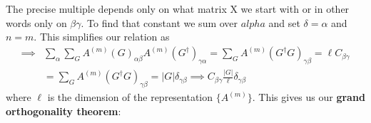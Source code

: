 \documentclass{article}
\begin{document}
	The precise multiple depends only on what matrix X we start with or in other words only on $\beta \gamma$. To find that constant we sum over $alpha$ and set $\delta = \alpha$ and $n = m$. This simplifies our relation as
	\begin{equation}
		\begin{split}
			\implies &\sum_\alpha \sum_{G}A^{(m)}(G)_{\alpha \beta}  A^{(m)}(G^\dagger)_{\gamma \alpha} = \sum_G A^{(m)}(G^\dagger G)_{\gamma \beta} = \ell C_{\beta \gamma}\\
			&=  \sum_G A^{(m)}(G^\dagger G)_{\gamma \beta} = |G| \delta_{\gamma \beta} \implies C_{\beta \gamma} \frac{|G|}{\ell} \delta_{\gamma \beta}
		\end{split}
	\end{equation}
	where $\ell$ is the dimension of the representation $\{A^{(m)}\}$. This gives us our \textbf{grand orthogonality theorem}:
	
\end{document}
